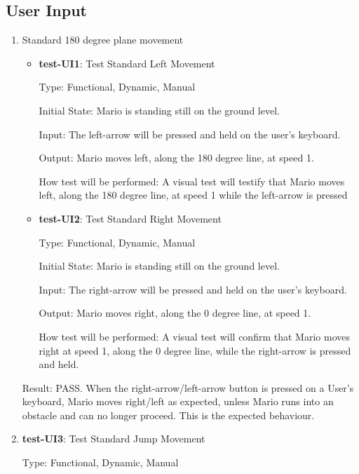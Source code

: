 \documentclass[12pt, titlepage]{article}
\begin{document}
\subsection{User Input}
\begin{enumerate}

\item Standard 180 degree plane movement
\begin{itemize}
\item{\textbf{test-UI1}: Test Standard Left Movement\\}

Type: Functional, Dynamic, Manual
					
Initial State: Mario is standing still on the ground level. 
					
Input: The left-arrow will be pressed and held on the user's keyboard.
					
Output: Mario moves left, along the 180 degree line, at speed 1.
					
How test will be performed: A visual test will testify that Mario moves left, along the 180 degree line, at speed 1 while the left-arrow is pressed

					
\item{\textbf{test-UI2}: Test Standard Right Movement\\}

Type: Functional, Dynamic, Manual
					
Initial State: Mario is standing still on the ground level.
					
Input: The right-arrow will be pressed and held on the user's keyboard.
					
Output: Mario moves right, along the 0 degree line, at speed 1.
					
How test will be performed: A visual test will confirm that Mario moves right at speed 1, along the 0 degree line, while the right-arrow is pressed and held.



\end{itemize}

Result: PASS. When the right-arrow/left-arrow button is pressed on a User's keyboard, Mario moves right/left as expected, unless Mario runs into an obstacle and can no longer proceed. This is the expected behaviour.

\item{\textbf{test-UI3}: Test Standard Jump Movement\\}

Type: Functional, Dynamic, Manual
					

\end{enumerate}
\end{document}
